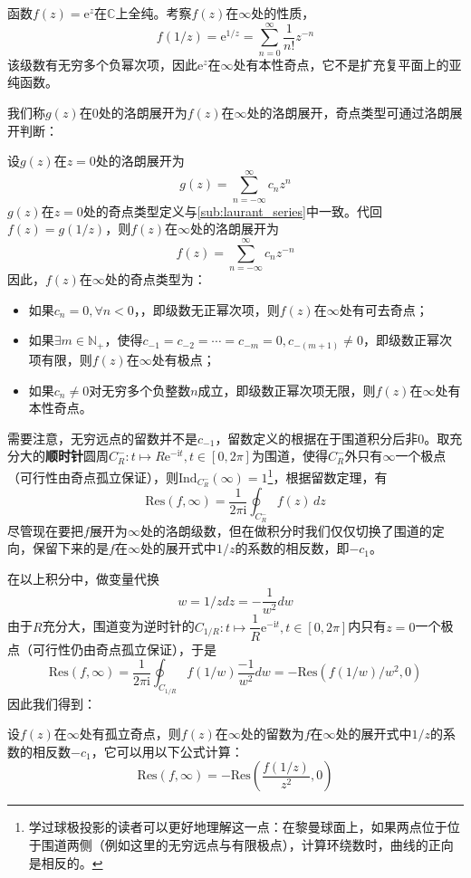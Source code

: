 \begin{example}
    函数$f(z)=\mathrm{e}^{z}$在$\mathbb{C}$上全纯。考察$f(z)$在$\infty$处的性质，
    \[f(1/z)=\mathrm{e}^{1/z}=\sum_{n=0}^{\infty}\frac{1}{n!}z^{-n}\]
    该级数有无穷多个负幂次项，因此$\mathrm{e}^{z}$在$\infty$处有本性奇点，它不是扩充复平面上的亚纯函数。
\end{example}

我们称$g(z)$在$0$处的洛朗展开为$f(z)$在$\infty$处的洛朗展开，奇点类型可通过洛朗展开判断：
\begin{definition}[无穷远点的洛朗展开与奇点类型]
    设$g(z)$在$z=0$处的洛朗展开为
    \[g(z)=\sum_{n=-\infty}^{\infty}c_n z^{n}\]
    $g(z)$在$z=0$处的奇点类型定义与\ref{sub:laurant_series}中一致。代回$f(z)=g(1/z)$，则$f(z)$在$\infty$处的洛朗展开为
    \[f(z)=\sum_{n=-\infty}^{\infty}c_n z^{-n}\]
    因此，$f(z)$在$\infty$处的奇点类型为：
    \begin{itemize}
        \item 如果$c_n=0,\forall n<0$，，即级数无正幂次项，则$f(z)$在$\infty$处有可去奇点；
        \item 如果$\exists m\in\mathbb{N}_+$，使得$c_{-1}=c_{-2}=\cdots =c_{-m}=0,c_{-(m+1)}\neq 0$，即级数正幂次项有限，则$f(z)$在$\infty$处有极点；
        \item 如果$c_n\neq 0$对无穷多个负整数$n$成立，即级数正幂次项无限，则$f(z)$在$\infty$处有本性奇点。
    \end{itemize}
\end{definition}

需要注意，无穷远点的留数并不是$c_{-1}$，留数定义的根据在于围道积分后非0。取充分大的\textbf{顺时针}圆周$C^-_R:t\mapsto R\mathrm{e}^{-\mathrm{i}t},t\in[0,2\pi]$为围道，使得$C^-_R$外只有$\infty$一个极点（可行性由奇点孤立保证），则$\text{Ind}_{C^-_R}(\infty)=1$\footnote{学过球极投影的读者可以更好地理解这一点：在黎曼球面上，如果两点位于位于围道两侧（例如这里的无穷远点与有限极点），计算环绕数时，曲线的正向是相反的。}，根据留数定理，有
$$\text{Res}(f,\infty)=\dfrac{1}{2\pi \mathrm{i}}\oint_{C^-_R}f(z)\,dz$$
尽管现在要把$f$展开为$\infty$处的洛朗级数，但在做积分时我们仅仅切换了围道的定向，保留下来的是$f$在$\infty$处的展开式中$1/z$的系数的相反数，即$-c_{1}$。

在以上积分中，做变量代换$$w=1/zdz=-\dfrac{1}{w^2}dw$$
由于$R$充分大，围道变为逆时针的$C_{1/R}:t\mapsto \dfrac{1}{R}\mathrm{e}^{-\mathrm{i}t},t\in[0,2\pi]$内只有$z=0$一个极点（可行性仍由奇点孤立保证），于是
\[\text{Res}(f,\infty)=\frac{1}{2\pi \mathrm{i}}\oint_{C_{1/R}}f(1/w)\frac{-1}{w^2}dw=-\text{Res}\left(f(1/w)/w^2,0\right)\]
因此我们得到：
\begin{proposition}[无穷远点的留数]
    设$f(z)$在$\infty$处有孤立奇点，则$f(z)$在$\infty$处的留数为$f$在$\infty$处的展开式中$1/z$的系数的相反数$-c_{1}$，它可以用以下公式计算：
    \[\text{Res}(f,\infty)=-\text{Res}\left(\frac{f(1/z)}{z^2},0\right)\]
\end{proposition}

